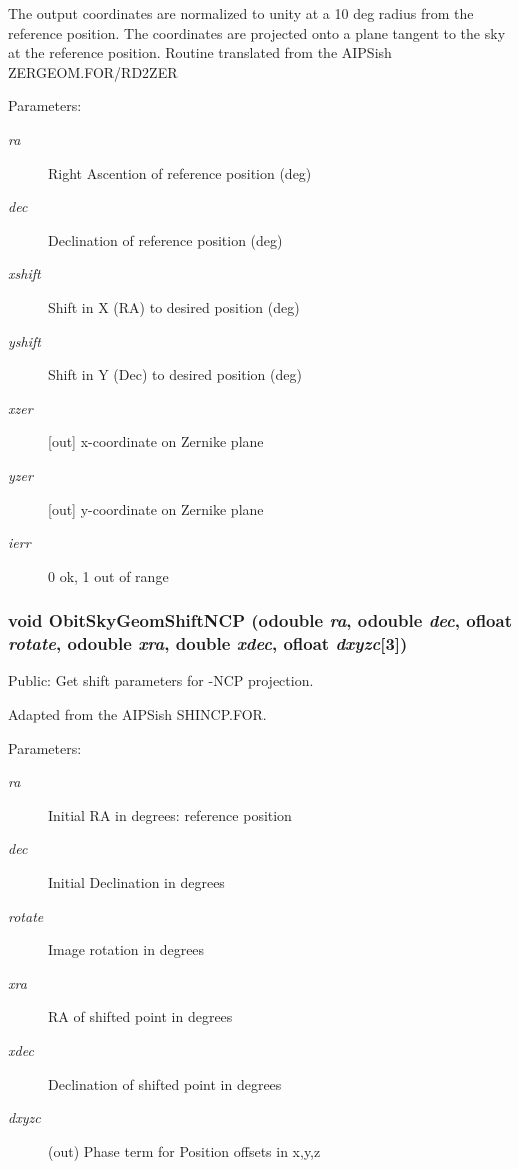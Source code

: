 The output coordinates are normalized to unity at a 10 deg radius from the reference position. The coordinates are projected onto a plane tangent to the sky at the reference position. Routine translated from the AIPSish ZERGEOM.FOR/RD2ZER \begin{Desc}
\item[Parameters:]
\begin{description}
\item[{\em ra}]Right Ascention of reference position (deg) \item[{\em dec}]Declination of reference position (deg) \item[{\em xshift}]Shift in X (RA) to desired position (deg) \item[{\em yshift}]Shift in Y (Dec) to desired position (deg) \item[{\em xzer}][out] x-coordinate on Zernike plane \item[{\em yzer}][out] y-coordinate on Zernike plane \item[{\em ierr}]0 ok, 1 out of range \end{description}
\end{Desc}
\subsubsection{\setlength{\rightskip}{0pt plus 5cm}void Obit\-Sky\-Geom\-Shift\-NCP ({\bf odouble} {\em ra}, {\bf odouble} {\em dec}, {\bf ofloat} {\em rotate}, {\bf odouble} {\em xra}, double {\em xdec}, {\bf ofloat} {\em dxyzc}[3])}\label{ObitSkyGeom_8h_a11}


Public: Get shift parameters for -NCP projection. 

Adapted from the AIPSish SHINCP.FOR. \begin{Desc}
\item[Parameters:]
\begin{description}
\item[{\em ra}]Initial RA in degrees: reference position \item[{\em dec}]Initial Declination in degrees \item[{\em rotate}]Image rotation in degrees \item[{\em xra}]RA of shifted point in degrees \item[{\em xdec}]Declination of shifted point in degrees \item[{\em dxyzc}](out) Phase term for Position offsets in x,y,z \end{description}
\end{Desc}

